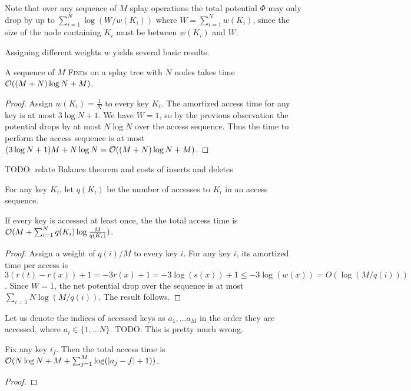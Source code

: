 Note that over any sequence of $M$ splay operations
the total potential $\Phi$ may only drop by up to $\sum_{i=1}^N \log(W/w(K_i))$
where $W=\sum_{i=1}^N w(K_i)$, since the size of the node containing $K_i$
must be between $w(K_i)$ and $W$.

Assigning different weights $w$ yields several basic results.

\begin{theorem}
A sequence of $M$ \textsc{Find}s on a splay tree with $N$ nodes takes time
$\mathcal{O}((M+N)\log N+M)$.
\end{theorem}
\begin{proof}
Assign $w(K_i) = \frac{1}{N}$ to every key $K_i$. The amortized
access time for any key is at most $3\log N+1$. We have $W=1$, so by
the previous observation the potential drops by at most $N\log N$ over
the access sequence. Thus the time to perform the access sequence is at most
$(3\log N+1)M + N\log N = \mathcal{O}((M+N)\log N + M)$.
\end{proof}

TODO: relate Balance theorem and costs of inserts and deletes

For any key $K_i$, let $q(K_i)$ be the number of accesses to $K_i$ in an access
sequence.
\begin{theorem}
If every key is accessed at least once, the the total access time is
$\mathcal{O}(M + \sum_{i=1}^N q(K_i)\log\frac{M}{q(K_i)})$.
\end{theorem}
\begin{proof}
Assign a weight of $q(i)/M$ to every key $i$. For any key $i$, its
amortized time per access is $3(r(t)-r(x))+1=-3r(x)+1=-3\log(s(x))+1\leq
	-3\log(w(x))=O(\log(M/q(i)))$.
Since $W=1$, the net potential drop over the sequence is at most
$\sum_{i=1}{N}\log(M/q(i))$. The result follows.
\end{proof}

Let us denote the indices of accessed keys as $a_1, \ldots a_M$
in the order they are accessed, where $a_i \in \{1,\ldots N\}$.
TODO: This is pretty much wrong.

\begin{theorem}
Fix any key $i_f$. Then the total access time is $\mathcal{O}(N\log N + M +
\sum_{j=1}^M \log(|a_j-f|+1))$.
\end{theorem}
\begin{proof}
\end{proof}

